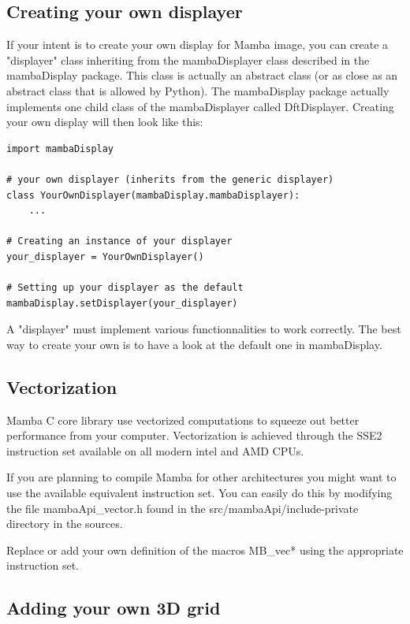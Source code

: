 \documentclass[a4paper,10pt,oneside]{article}
\begin{document}
\subsection{Creating your own displayer}
\label{cha:create_own_disp}

If your intent is to create your own display for Mamba image, you can create
a "displayer" class inheriting from the mambaDisplayer class described in the
mambaDisplay package. This class is actually an abstract class (or as close
as an abstract class that is allowed by Python). The mambaDisplay package
actually implements one child class of the mambaDisplayer called DftDisplayer.
Creating your own display will then look like this:

\lstset{language=Python}
\begin{lstlisting}
import mambaDisplay

# your own displayer (inherits from the generic displayer)
class YourOwnDisplayer(mambaDisplay.mambaDisplayer):
    ...
    
# Creating an instance of your displayer
your_displayer = YourOwnDisplayer()

# Setting up your displayer as the default
mambaDisplay.setDisplayer(your_displayer)
\end{lstlisting}

A "displayer" must implement various functionnalities to work correctly. The 
best way to create your own is to have a look at the default one in mambaDisplay.

\subsection{Vectorization}
\label{cha:vectorization}

Mamba C core library use vectorized computations to squeeze out better 
performance from your computer. Vectorization is achieved through the SSE2
instruction set available on all modern intel and AMD CPUs.

If you are planning to compile Mamba for other architectures you might want to
use the available equivalent instruction set. You can easily do this by modifying
the file mambaApi\_vector.h found in the src/mambaApi/include-private directory
in the sources.

Replace or add your own definition of the macros MB\_vec* using the appropriate
instruction set.

\subsection{Adding your own 3D grid}
\label{cha:create_grid3D}
\end{document}
